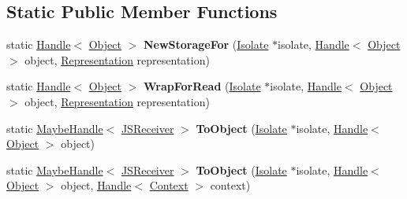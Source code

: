 \subsection*{Static Public Member Functions}
\begin{DoxyCompactItemize}
\item 
\hypertarget{classv8_1_1internal_1_1_object_a4ec27010c6dde9b572edde3d6cbed59d}{}static \hyperlink{classv8_1_1internal_1_1_handle}{Handle}$<$ \hyperlink{classv8_1_1internal_1_1_object}{Object} $>$ {\bfseries New\+Storage\+For} (\hyperlink{classv8_1_1internal_1_1_isolate}{Isolate} $\ast$isolate, \hyperlink{classv8_1_1internal_1_1_handle}{Handle}$<$ \hyperlink{classv8_1_1internal_1_1_object}{Object} $>$ object, \hyperlink{classv8_1_1internal_1_1_representation}{Representation} representation)\label{classv8_1_1internal_1_1_object_a4ec27010c6dde9b572edde3d6cbed59d}

\item 
\hypertarget{classv8_1_1internal_1_1_object_ad298cb85c34c4199e7eff968e5c5cda6}{}static \hyperlink{classv8_1_1internal_1_1_handle}{Handle}$<$ \hyperlink{classv8_1_1internal_1_1_object}{Object} $>$ {\bfseries Wrap\+For\+Read} (\hyperlink{classv8_1_1internal_1_1_isolate}{Isolate} $\ast$isolate, \hyperlink{classv8_1_1internal_1_1_handle}{Handle}$<$ \hyperlink{classv8_1_1internal_1_1_object}{Object} $>$ object, \hyperlink{classv8_1_1internal_1_1_representation}{Representation} representation)\label{classv8_1_1internal_1_1_object_ad298cb85c34c4199e7eff968e5c5cda6}

\item 
\hypertarget{classv8_1_1internal_1_1_object_a387daeb7095989abd0f2571fc721743a}{}static \hyperlink{classv8_1_1internal_1_1_maybe_handle}{Maybe\+Handle}$<$ \hyperlink{classv8_1_1internal_1_1_j_s_receiver}{J\+S\+Receiver} $>$ {\bfseries To\+Object} (\hyperlink{classv8_1_1internal_1_1_isolate}{Isolate} $\ast$isolate, \hyperlink{classv8_1_1internal_1_1_handle}{Handle}$<$ \hyperlink{classv8_1_1internal_1_1_object}{Object} $>$ object)\label{classv8_1_1internal_1_1_object_a387daeb7095989abd0f2571fc721743a}

\item 
\hypertarget{classv8_1_1internal_1_1_object_ae214735eb635a7bba5d15da1017577d2}{}static \hyperlink{classv8_1_1internal_1_1_maybe_handle}{Maybe\+Handle}$<$ \hyperlink{classv8_1_1internal_1_1_j_s_receiver}{J\+S\+Receiver} $>$ {\bfseries To\+Object} (\hyperlink{classv8_1_1internal_1_1_isolate}{Isolate} $\ast$isolate, \hyperlink{classv8_1_1internal_1_1_handle}{Handle}$<$ \hyperlink{classv8_1_1internal_1_1_object}{Object} $>$ object, \hyperlink{classv8_1_1internal_1_1_handle}{Handle}$<$ \hyperlink{classv8_1_1internal_1_1_context}{Context} $>$ context)\label{classv8_1_1internal_1_1_object_ae214735eb635a7bba5d15da1017577d2}


\end{DoxyCompactItemize}
